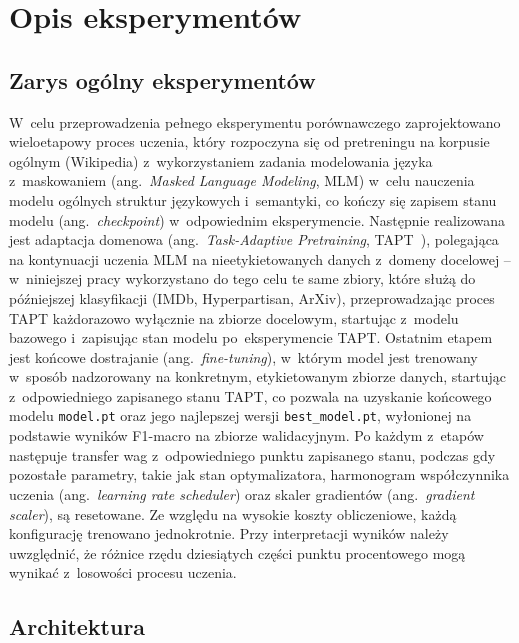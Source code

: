 \documentclass[a4paper,11pt,twoside]{report}
\theoremstyle{definition}
\begin{document}
\section{Opis eksperymentów}\label{sec:experiments-description}



\subsection{Zarys ogólny eksperymentów}
W~celu przeprowadzenia pełnego eksperymentu porównawczego zaprojektowano wieloetapowy proces uczenia, który rozpoczyna się od pretreningu na korpusie ogólnym (Wikipedia) z~wykorzystaniem zadania modelowania języka z~maskowaniem (ang.\ \emph{Masked Language Modeling}, MLM) w~celu nauczenia modelu ogólnych struktur językowych i~semantyki, co kończy się zapisem stanu modelu (ang.\ \emph{checkpoint}) w~odpowiednim eksperymencie. Następnie realizowana jest adaptacja domenowa (ang.\ \emph{Task-Adaptive Pretraining}, TAPT~\cite{gururangan-etal-2020-dont}), polegająca na kontynuacji uczenia MLM na nieetykietowanych danych z~domeny docelowej -- w~niniejszej pracy wykorzystano do tego celu te same zbiory, które służą do późniejszej klasyfikacji (IMDb, Hyperpartisan, ArXiv), przeprowadzając proces TAPT każdorazowo wyłącznie na zbiorze docelowym, startując z~modelu bazowego i~zapisując stan modelu po~eksperymencie TAPT. Ostatnim etapem jest końcowe dostrajanie (ang.\ \emph{fine-tuning}), w~którym model jest trenowany w~sposób nadzorowany na konkretnym, etykietowanym zbiorze danych, startując z~odpowiedniego zapisanego stanu TAPT, co pozwala na uzyskanie końcowego modelu \texttt{model.pt} oraz jego najlepszej wersji \texttt{best\_model.pt}, wyłonionej na podstawie wyników F1-macro na zbiorze walidacyjnym. Po każdym z~etapów następuje transfer wag z~odpowiedniego punktu zapisanego stanu, podczas gdy pozostałe parametry, takie jak stan optymalizatora, harmonogram współczynnika uczenia (ang.\ \emph{learning rate scheduler}) oraz skaler gradientów (ang.\ \emph{gradient scaler}), są resetowane. Ze względu na wysokie koszty obliczeniowe, każdą konfigurację trenowano jednokrotnie. Przy interpretacji wyników należy uwzględnić, że różnice rzędu dziesiątych części punktu procentowego mogą wynikać z~losowości procesu uczenia.

\subsection{Architektura}\label{sec:experiments-arch}
\end{document}
